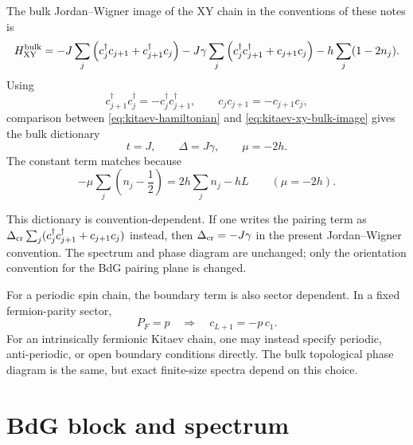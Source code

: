 The bulk Jordan--Wigner image of the XY chain in the conventions of these notes
is
\begin{equation}
\label{eq:kitaev-xy-bulk-image}
    H_{\rm XY}^{\rm bulk}
    =
    -J\sum_j
    \left(
        c_j^\dagger c_{j+1}+c_{j+1}^\dagger c_j
    \right)
    -J\gamma\sum_j
    \left(
        c_j^\dagger c_{j+1}^\dagger+c_{j+1}c_j
    \right)
    -h\sum_j(1-2n_j).
\end{equation}
Using
\begin{equation}
    c_{j+1}^\dagger c_j^\dagger=-c_j^\dagger c_{j+1}^\dagger,
    \qquad
    c_jc_{j+1}=-c_{j+1}c_j,
\end{equation}
comparison between \cref{eq:kitaev-hamiltonian} and
\cref{eq:kitaev-xy-bulk-image} gives the bulk dictionary
\begin{equation}
\label{eq:kitaev-xy-dictionary}
    t=J,
    \qquad
    \Delta=J\gamma,
    \qquad
    \mu=-2h.
\end{equation}
The constant term matches because
\begin{equation}
    -\mu\sum_j\left(n_j-\frac12\right)
    =
    2h\sum_j n_j-hL
    \qquad
    (\mu=-2h).
\end{equation}

This dictionary is convention-dependent.  If one writes the pairing term as
$\Delta_{\rm cr}\sum_j(c_j^\dagger c_{j+1}^\dagger+c_{j+1}c_j)$ instead, then
$\Delta_{\rm cr}=-J\gamma$ in the present Jordan--Wigner convention.  The
spectrum and phase diagram are unchanged; only the orientation convention for
the BdG pairing plane is changed.

For a periodic spin chain, the boundary term is also sector dependent.  In a
fixed fermion-parity sector,
\begin{equation}
\label{eq:kitaev-boundary-from-spin}
    P_F=p
    \quad\Longrightarrow\quad
    c_{L+1}=-p\,c_1.
\end{equation}
For an intrinsically fermionic Kitaev chain, one may instead specify periodic,
anti-periodic, or open boundary conditions directly.  The bulk topological phase
diagram is the same, but exact finite-size spectra depend on this choice.

\section{BdG block and spectrum}
\label{sec:kitaev-bdg-block-spectrum}

